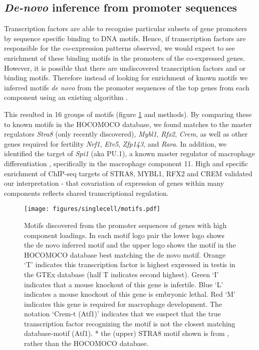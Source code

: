 \subsection{\emph{De-novo} inference from promoter sequences}
Transcription factors are able to recognise particular subsets of gene promoters by sequence specific binding to DNA motifs. Hence, if transcription factors are responsible for the co-expression patterns observed, we would expect to see enrichment of these binding motifs in the promoters of the co-expressed genes. However, it is possible that there are undiscovered transcription factors and or binding motifs. Therefore instead of looking for enrichment of known motifs we inferred motifs \textit{de novo} from the promoter sequences of the top genes from each component using an existing algorithm \parencite{Altemose2017map, Davies2016Reengineering}.

This resulted in 16 groups of motifs (figure \ref{fig:motifs} and methods). By comparing these to known motifs in the HOCOMOCO database, we found matches to the master regulators \textit{Stra8} (only recently discovered), \textit{Mybl1}, \textit{Rfx2}, \textit{Crem}, as well as other genes required for fertility \textit{Nrf1}, \textit{Etv5}, \textit{Zfp143}, and \textit{Rara}. In addition, we identified the target of \textit{Spi1} (aka PU.1), a known master regulator of macrophage differentiation \parencite{Rosa2007interplay}, specifically in the macrophage component 11. High and specific enrichment of ChIP-seq targets of STRA8, MYBL1, RFX2 and CREM validated our interpretation - that covariation of expression of genes within many components reflects shared transcriptional regulation.

\begin{figure}[H]
	\centering
	\texttt{[image: figures/singlecell/motifs.pdf]}
	\caption[Denovo Motifs]{
		Motifs discovered from the promoter sequences of genes with high component loadings. In each motif logo pair the lower logo shows the de novo inferred motif and the upper logo shows the motif in the HOCOMOCO database best matching the de novo motif. Orange ‘T’ indicates this transcription factor is highest expressed in testis in the GTEx database (half T indicates second highest). Green ‘I’ indicates that a mouse knockout of this gene is infertile. Blue ‘L’ indicates a mouse knockout of this gene is embryonic lethal. Red ‘M’ indicates this gene is required for macrophage development. The notation ‘Crem-t (Atf1)’ indicates that we suspect that the true transcription factor recognizing the motif is not the closest matching database-motif (Atf1). * the (upper) STRA8 motif shown is from \cite{Kojima2019Amplification}, rather than the HOCOMOCO database.
	}
	\label{fig:motifs}
\end{figure}


